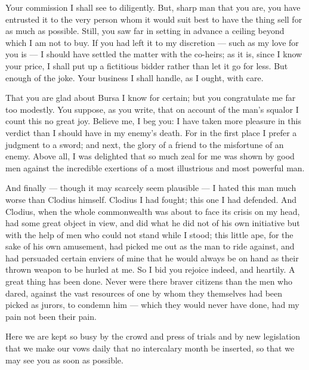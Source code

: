 

 Your commission I shall see to diligently. But, sharp man that you are, you have entrusted it to the very person whom it would suit best to have the thing sell for as much as possible. Still, you saw far in setting in advance a ceiling beyond which I am not to buy. If you had left it to my discretion --- such as my love for you is --- I should have settled the matter with the co-heirs; as it is, since I know your price, I shall put up a fictitious bidder rather than let it go for less. But enough of the joke. Your business I shall handle, as I ought, with care.

 That you are glad about Bursa I know for certain; but you congratulate me far too modestly. You suppose, as you write, that on account of the man's squalor I count this no great joy. Believe me, I beg you: I have taken more pleasure in this verdict than I should have in my enemy's death. For in the first place I prefer a judgment to a sword; and next, the glory of a friend to the misfortune of an enemy. Above all, I was delighted that so much zeal for me was shown by good men against the incredible exertions of a most illustrious and most powerful man.

 And finally --- though it may scarcely seem plausible --- I hated this man much worse than Clodius himself. Clodius I had fought; this one I had defended. And Clodius, when the whole commonwealth was about to face its crisis on my head, had some great object in view, and did what he did not of his own initiative but with the help of men who could not stand while I stood; this little ape, for the sake of his own amusement, had picked me out as the man to ride against, and had persuaded certain enviers of mine that he would always be on hand as their thrown weapon to be hurled at me. So I bid you rejoice indeed, and heartily. A great thing has been done. Never were there braver citizens than the men who dared, against the vast resources of one by whom they themselves had been picked as jurors, to condemn him --- which they would never have done, had my pain not been their pain.

 Here we are kept so busy by the crowd and press of trials and by new legislation that we make our vows daily that no intercalary month be inserted, so that we may see you as soon as possible.
